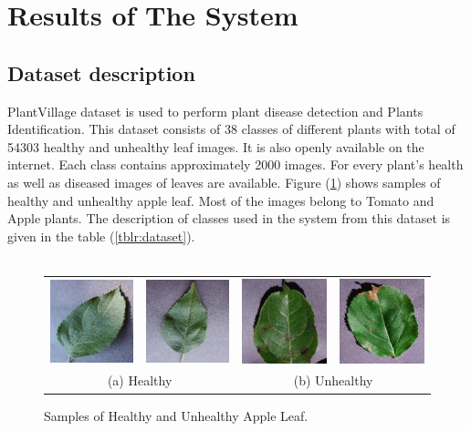 \section{Results of The System}

\subsection{Dataset description}

PlantVillage dataset is used to perform plant disease detection and Plants 
Identification. This dataset consists of 38 classes of different plants with total of 54303 healthy and unhealthy leaf 
images. It is also openly available on the internet. Each class contains 
approximately 2000 images. For every plant's health as well as diseased images 
of leaves are available. Figure (\ref{fig:samplehealth}) shows samples of healthy and unhealthy apple leaf. Most of the images belong to Tomato and Apple plants. 
The description of classes used in the system from this dataset is given in the
table (\ref{tblr:dataset}). \\\\

\begin{figure}[H]
    \centering
    \begin{tabular}{cccc}
        \includegraphics[width=3cm]{photos/chapter05/1.jpg} & \includegraphics[width=3cm]{photos/chapter05/2.jpg} 
        & \includegraphics[width=3cm]{photos/chapter05/3.jpg} &  \includegraphics[width=3cm]{photos/chapter05/4.jpg} \\[3pt]
        \multicolumn{2}{c}{(a) Healthy} & \multicolumn{2}{c}{(b) Unhealthy} \\[1pt]
    \end{tabular}
    \caption{Samples of Healthy and Unhealthy Apple Leaf.}
    \label{fig:samplehealth}
\end{figure}

